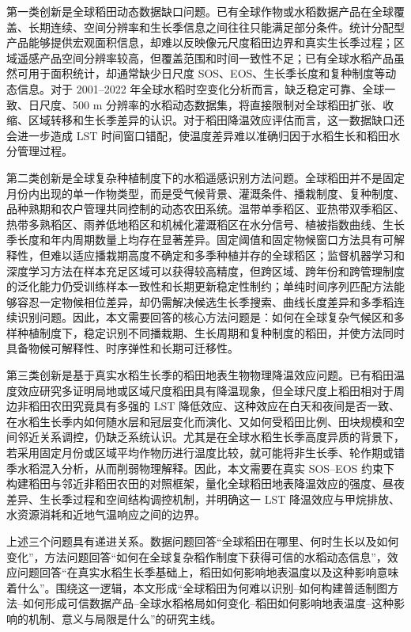 第一类创新是全球稻田动态数据缺口问题。已有全球作物或水稻数据产品在全球覆盖、长期连续、空间分辨率和生长季信息之间往往只能满足部分条件。统计分配型产品能够提供宏观面积信息，却难以反映像元尺度稻田边界和真实生长季过程；区域遥感产品空间分辨率较高，但覆盖范围和时间一致性不足；已有全球水稻产品虽然可用于面积统计，却通常缺少日尺度 SOS、EOS、生长季长度和复种制度等动态信息。对于 2001--2022 年全球水稻时空变化分析而言，缺乏稳定可靠、全球一致、日尺度、500 m 分辨率的水稻动态数据集，将直接限制对全球稻田扩张、收缩、区域转移和生长季差异的认识。对于稻田降温效应评估而言，这一数据缺口还会进一步造成 LST 时间窗口错配，使温度差异难以准确归因于水稻生长和稻田水分管理过程。

第二类创新是全球复杂种植制度下的水稻遥感识别方法问题。全球稻田并不是固定月份内出现的单一作物类型，而是受气候背景、灌溉条件、播栽制度、复种制度、品种熟期和农户管理共同控制的动态农田系统。温带单季稻区、亚热带双季稻区、热带多熟稻区、雨养低地稻区和机械化灌溉稻区在水分信号、植被指数曲线、生长季长度和年内周期数量上均存在显著差异。固定阈值和固定物候窗口方法具有可解释性，但难以适应播栽期高度不确定和多季种植并存的全球稻区；监督机器学习和深度学习方法在样本充足区域可以获得较高精度，但跨区域、跨年份和跨管理制度的泛化能力仍受训练样本一致性和长期更新稳定性制约；单纯时间序列匹配方法能够容忍一定物候相位差异，却仍需解决候选生长季搜索、曲线长度差异和多季稻连续识别问题。因此，本文需要回答的核心方法问题是：如何在全球复杂气候区和多样种植制度下，稳定识别不同播栽期、生长周期和复种制度的稻田，并使方法同时具备物候可解释性、时序弹性和长期可迁移性。

第三类创新是基于真实水稻生长季的稻田地表生物物理降温效应问题。已有稻田温度效应研究多证明局地或区域尺度稻田具有降温现象，但全球尺度上稻田相对于周边非稻田农田究竟具有多强的 LST 降低效应、这种效应在白天和夜间是否一致、在水稻生长季内如何随水层和冠层变化而演化、又如何受稻田比例、田块规模和空间邻近关系调控，仍缺乏系统认识。尤其是在全球水稻生长季高度异质的背景下，若采用固定月份或区域平均作物历进行温度比较，就可能将非生长季、轮作期或错季水稻混入分析，从而削弱物理解释。因此，本文需要在真实 SOS--EOS 约束下构建稻田与邻近非稻田农田的对照框架，量化全球稻田地表降温效应的强度、昼夜差异、生长季过程和空间结构调控机制，并明确这一 LST 降温效应与甲烷排放、水资源消耗和近地气温响应之间的边界。

上述三个问题具有递进关系。数据问题回答“全球稻田在哪里、何时生长以及如何变化”，方法问题回答“如何在全球复杂稻作制度下获得可信的水稻动态信息”，效应问题回答“在真实水稻生长季基础上，稻田如何影响地表温度以及这种影响意味着什么”。围绕这一逻辑，本文形成“全球稻田为何难以识别--如何构建普适制图方法--如何形成可信数据产品--全球水稻格局如何变化--稻田如何影响地表温度--这种影响的机制、意义与局限是什么”的研究主线。

